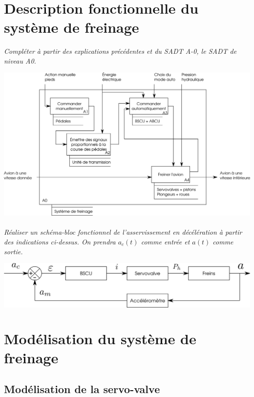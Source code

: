 \documentclass[10pt,oneside]{article}
\begin{document}
\section{Description fonctionnelle du système de freinage}

\paragraph{}
\textit{Compléter à partir des explications précédentes et du SADT A-0, le SADT de niveau A0.}
\begin{center}
 \includegraphics[width=.8\textwidth]{png/SADT}
\end{center}

\paragraph{}
\textit{Réaliser un schéma-bloc fonctionnel de l'asservissement en décélération à partir des
indications ci-dessus. On prendra $a_c(t)$ comme entrée et $a(t)$ comme sortie.}

\begin{center}
 \includegraphics[width=.8\textwidth]{png/blocs}
\end{center}

\section{Modélisation du système de freinage}

\subsection{Modélisation de la servo-valve}
\end{document}
